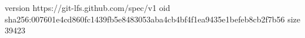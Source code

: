 version https://git-lfs.github.com/spec/v1
oid sha256:007601e4cd860fc1439fb5e8483053aba4cb4bf4f1ea9435e1befeb8cb2f7b56
size 39423
